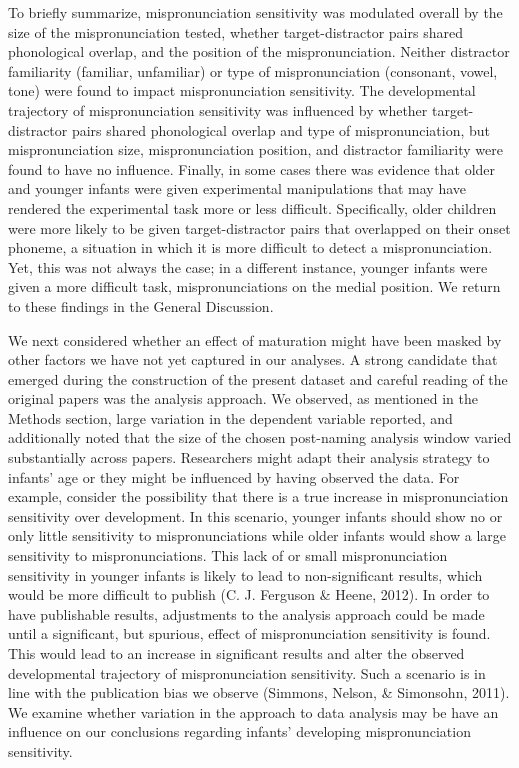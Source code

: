 \documentclass[man]{apa6}
\theoremstyle{definition}
\theoremstyle{definition}
\theoremstyle{definition}
\theoremstyle{remark}
\begin{document}
To briefly summarize, mispronunciation sensitivity was modulated overall
by the size of the mispronunciation tested, whether target-distractor
pairs shared phonological overlap, and the position of the
mispronunciation. Neither distractor familiarity (familiar, unfamiliar)
or type of mispronunciation (consonant, vowel, tone) were found to
impact mispronunciation sensitivity. The developmental trajectory of
mispronunciation sensitivity was influenced by whether target-distractor
pairs shared phonological overlap and type of mispronunciation, but
mispronunciation size, mispronunciation position, and distractor
familiarity were found to have no influence. Finally, in some cases
there was evidence that older and younger infants were given
experimental manipulations that may have rendered the experimental task
more or less difficult. Specifically, older children were more likely to
be given target-distractor pairs that overlapped on their onset phoneme,
a situation in which it is more difficult to detect a mispronunciation.
Yet, this was not always the case; in a different instance, younger
infants were given a more difficult task, mispronunciations on the
medial position. We return to these findings in the General Discussion.

We next considered whether an effect of maturation might have been
masked by other factors we have not yet captured in our analyses. A
strong candidate that emerged during the construction of the present
dataset and careful reading of the original papers was the analysis
approach. We observed, as mentioned in the Methods section, large
variation in the dependent variable reported, and additionally noted
that the size of the chosen post-naming analysis window varied
substantially across papers. Researchers might adapt their analysis
strategy to infants' age or they might be influenced by having observed
the data. For example, consider the possibility that there is a true
increase in mispronunciation sensitivity over development. In this
scenario, younger infants should show no or only little sensitivity to
mispronunciations while older infants would show a large sensitivity to
mispronunciations. This lack of or small mispronunciation sensitivity in
younger infants is likely to lead to non-significant results, which
would be more difficult to publish (C. J. Ferguson \& Heene, 2012). In
order to have publishable results, adjustments to the analysis approach
could be made until a significant, but spurious, effect of
mispronunciation sensitivity is found. This would lead to an increase in
significant results and alter the observed developmental trajectory of
mispronunciation sensitivity. Such a scenario is in line with the
publication bias we observe (Simmons, Nelson, \& Simonsohn, 2011). We
examine whether variation in the approach to data analysis may be have
an influence on our conclusions regarding infants' developing
mispronunciation sensitivity.
\end{document}
